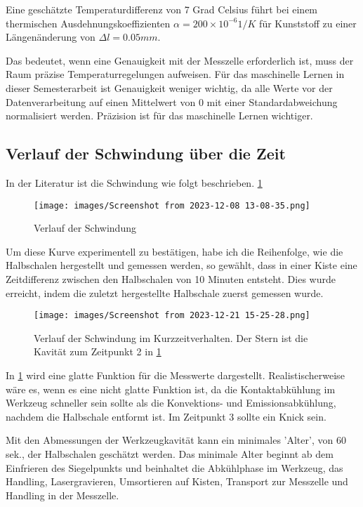 Eine geschätzte Temperaturdifferenz von 7 Grad Celsius führt bei einem thermischen Ausdehnungskoeffizienten $\alpha = 200 \times 10^{-6}1/K$ für Kunststoff zu einer Längenänderung von $\Delta l = 0.05 mm$.

Das bedeutet, wenn eine Genauigkeit mit der Messzelle erforderlich ist, muss der Raum präzise Temperaturregelungen aufweisen. Für das maschinelle Lernen in dieser Semesterarbeit ist Genauigkeit weniger wichtig, da alle Werte vor der Datenverarbeitung auf einen Mittelwert von 0 mit einer Standardabweichung normalisiert werden. Präzision ist für das maschinelle Lernen wichtiger.

\subsection{Verlauf der Schwindung über die Zeit}

In der Literatur ist die Schwindung wie folgt beschrieben. \ref{fig:VerlaufSchwindLit}

\begin{figure}
   
  \texttt{[image: images/Screenshot from 2023-12-08 13-08-35.png]}
  \caption{Verlauf der Schwindung \cite{SchwindungLit}}
  \label{fig:VerlaufSchwindLit}
\end{figure}

Um diese Kurve experimentell zu bestätigen, habe ich die Reihenfolge, wie die Halbschalen hergestellt und gemessen werden, so gewählt, dass in einer Kiste eine Zeitdifferenz zwischen den Halbschalen von 10 Minuten entsteht. Dies wurde erreicht, indem die zuletzt hergestellte Halbschale zuerst gemessen wurde.

\begin{figure}
   
  \texttt{[image: images/Screenshot from 2023-12-21 15-25-28.png]}
  \caption{Verlauf der Schwindung im Kurzzeitverhalten. Der Stern ist die Kavität zum Zeitpunkt 2 in \ref{fig:VerlaufSchwindLit}}
  \label{fig:VerlaufSchwindExp}
\end{figure}

In \ref{fig:VerlaufSchwindLit} wird eine glatte Funktion für die Messwerte dargestellt. Realistischerweise wäre es, wenn es eine nicht glatte Funktion ist, da die Kontaktabkühlung im Werkzeug schneller sein sollte als die Konvektions- und Emissionsabkühlung, nachdem die Halbschale entformt ist. Im Zeitpunkt 3 sollte ein Knick sein.

Mit den Abmessungen der Werkzeugkavität kann ein minimales 'Alter', von 60 sek., der Halbschalen geschätzt werden. Das minimale Alter beginnt ab dem Einfrieren des Siegelpunkts und beinhaltet die Abkühlphase im Werkzeug, das Handling, Lasergravieren, Umsortieren auf Kisten, Transport zur Messzelle und Handling in der Messzelle.


